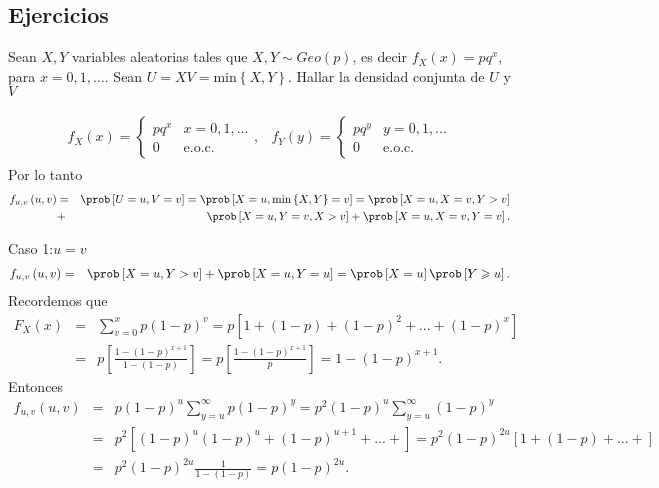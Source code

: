 \subsection{Ejercicios}
\begin{Ejem}
Sean $X,Y$ variables aleatorias tales que $X,Y \sim Geo \left( p \right)$, es decir $f_{X}\left(x \right)=pq^{x}$, para $x=0,1,\ldots$. 
Sean $U=X V= \textrm {min} \left\{X,Y \right\}$. Hallar la densidad conjunta de $U$ y $V$

\begin{eqnarray*}
\begin{array}{ll}
f_{X}\left(x\right) = \begin{cases}
pq^{x} & x=0,1,...\\  
0 & \textrm {e.o.c.}
\end{cases},  &
f_{Y}\left(y\right) = \begin{cases}
pq^{y} & y=0,1,...\\  
0 & \textrm {e.o.c.}
\end{cases} 
\end{array}
\end{eqnarray*}
Por lo tanto
\begin{eqnarray*}
f_{u,v}\left(u,v \right) &=& \prob \left[U=u , V=v \right]= \prob \left[ X=u, \textrm{min}\left\{X,Y \right\}=v \right]=\prob \left[X=u, X=v,Y>v \right]\\
&+&\prob \left[X=u, Y=v, X>v \right]+\prob \left[X=u, X=v,Y=v \right].
\end{eqnarray*}
 
 Caso 1:$u=v$
\begin{eqnarray*}
f_{u,v}\left(u,v \right)&=&\prob \left[X=u, Y>v \right]+ \prob \left[X=u, Y=u \right]=\prob \left[ X=u\right]\prob \left[Y\geqslant u \right].
\end{eqnarray*}
Recordemos que 
\begin{eqnarray*}
F_{X}\left(x \right) &=& \sum_{v=0}^{x} p \left(1-p \right)^{v} = p \left[1+ \left(1-p \right)+\left(1-p \right)^{2}+...+ \left(1-p\right)^{x} \right]\\
&=& p \left[ \frac{1- \left( 1-p \right)^{x+1}} {1-\left(1-p \right)} \right] = p \left[\frac{1-\left(1-p \right)^{x+1} }{p} \right]= 1-\left(1-p \right)^{x+1}.
\end{eqnarray*}
Entonces
\begin{eqnarray*}
f_{u,v}\left(u,v \right)&=& p \left(1-p \right)^{u} \sum_{y=u}^{\infty} p \left(1-p \right)^{y}= p^{2}\left(1-p  \right)^{u} \sum_{y=u}^{\infty} \left(1-p\right)^{y}\\
&=& p^{2}\left[\left(1-p \right)^{u}\left(1-p \right)^{u}+ \left(1-p \right)^{u+1}+...+ \right]= p^{2}\left(1-p \right)^{2u}\left[1 + \left(1-p \right)+ ...+ \right]\\
&=& p^{2}\left(1-p \right)^{2u} \frac{1}{1-\left(1-p \right) } = p\left(1-p \right)^{2u}.
\end{eqnarray*}  


\end{Ejem}
